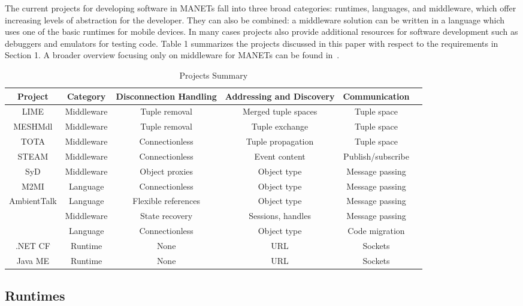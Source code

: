 \documentclass{sig-alternate}
\begin{document}
The current projects for developing software in MANETs fall into three broad categories: runtimes, languages, and middleware, which offer increasing levels of abstraction for the developer. They can also be combined: a middleware solution can be written in a language which uses one of the basic runtimes for mobile devices. In many cases projects also provide additional resources for software development such as debuggers and emulators for testing code. Table 1 summarizes the projects discussed in this paper with respect to the requirements in Section 1. A broader overview focusing only on middleware for MANETs can be found in~\cite{middlewaresurvey}.

\begin{table*}
\centering
\caption{Projects Summary}
\begin{tabular}{|c|c|c|c|c|c|} \hline
Project & Category & Disconnection Handling & Addressing and Discovery & Communication \\ \hline
LIME & Middleware & Tuple removal & Merged tuple spaces & Tuple space \\ \hline
MESHMdl & Middleware & Tuple removal & Tuple exchange & Tuple space \\ \hline
TOTA & Middleware & Connectionless & Tuple propagation & Tuple space \\ \hline
STEAM & Middleware  & Connectionless & Event content & Publish/subscribe \\ \hline
SyD & Middleware &  Object proxies &  Object type & Message passing \\ \hline
M2MI & Language & Connectionless &  Object type & Message passing \\ \hline
AmbientTalk & Language &  Flexible references &  Object type & Message passing \\ \hline
\begin{comment}YCab & Middleware &  State recovery &  Sessions, handles & Message passing \\ \hline\end{comment}
SpatialViews & Language & Connectionless & Object type & Code migration \\ \hline
.NET CF & Runtime &  None & URL & Sockets \\ \hline
Java ME & Runtime & None & URL & Sockets \\ \hline
\end{tabular}
\end{table*}

\subsection{Runtimes}
\end{document}
